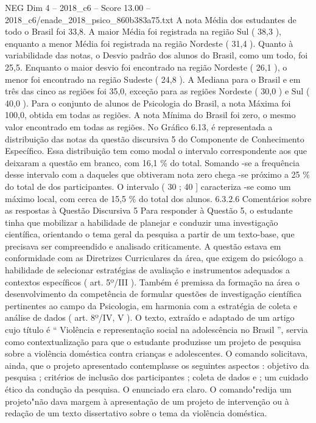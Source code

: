 \begin{textsample}{NEG Dim 4 – 2018\_c6 – Score 13.00 – 2018\_c6/enade\_2018\_psico\_860b383a75.txt}
A nota Média dos estudantes de todo o Brasil foi 33,8.
A maior Média foi registrada na região Sul ( 38,3 ), enquanto a menor Média foi registrada na região Nordeste ( 31,4 ).
Quanto à variabilidade das notas, o Desvio padrão dos alunos do Brasil, como um todo, foi 25,5.
Enquanto o maior desvio foi encontrado na região Nordeste ( 26,1 ), o menor foi encontrado na região Sudeste ( 24,8 ).
A Mediana para o Brasil e em três das cinco as regiões foi 35,0, exceção para as regiões Nordeste ( 30,0 ) e Sul ( 40,0 ).
Para o conjunto de alunos de Psicologia do Brasil, a nota Máxima foi 100,0, obtida em todas as regiões.
A nota Mínima do Brasil foi zero, o mesmo valor encontrado em todas as regiões.
No Gráfico 6.13, é representada a distribuição das notas da questão discursiva 5 do Componente de Conhecimento Específico.
Essa distribuição tem como modal o intervalo correspondente aos que deixaram a questão em branco, com 16,1 \% do total.
Somando -se a frequência desse intervalo com a daqueles que obtiveram nota zero chega -se próximo a 25 \% do total de dos participantes.
O intervalo ( 30 ; 40 ] caracteriza -se como um máximo local, com cerca de 15,5 \% do total dos alunos. 6.3.2.6 Comentários sobre as respostas à Questão Discursiva 5 Para responder à Questão 5, o estudante tinha que mobilizar a habilidade de planejar e conduzir uma investigação científica, orientando o tema geral da pesquisa a partir de um texto-base, que precisava ser compreendido e analisado criticamente.
A questão estava em conformidade com as Diretrizes Curriculares da área, que exigem do psicólogo a habilidade de selecionar estratégias de avaliação e instrumentos adequados a contextos específicos ( art. 5º/III ).
Também é premissa da formação na área o desenvolvimento da competência de formular questões de investigação científica pertinentes ao campo da Psicologia, em harmonia com a estratégia de coleta e análise de dados ( art. 8º/IV, V ).
O texto, extraído e adaptado de um artigo cujo título é “ Violência e representação social na adolescência no Brasil ”, servia como contextualização para que o estudante produzisse um projeto de pesquisa sobre a violência doméstica contra crianças e adolescentes.
O comando solicitava, ainda, que o projeto apresentado contemplasse os seguintes aspectos : objetivo da pesquisa ; critérios de inclusão dos participantes ; coleta de dados e ; um cuidado ético da condução da pesquisa.
O enunciado era claro.
O comando"redija um projeto"não dava margem à apresentação de um projeto de intervenção ou à redação de um texto dissertativo sobre o tema da violência doméstica.

\end{textsample}
